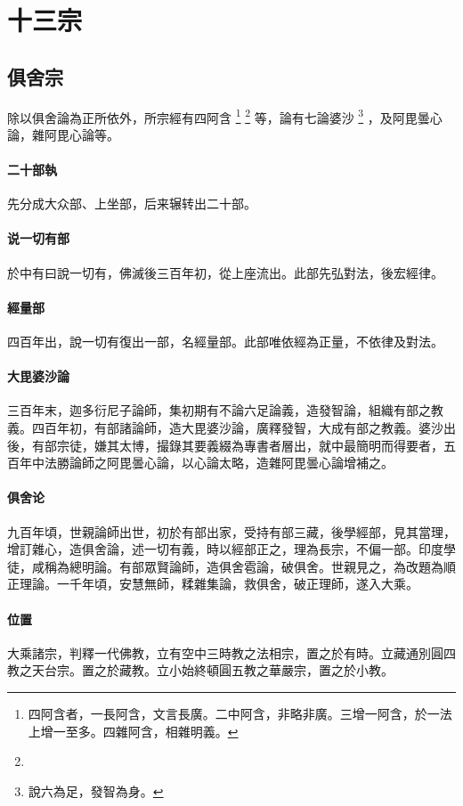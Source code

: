 \section{十三宗}

\subsection{俱舍宗}
除以俱舍論為正所依外，所宗經有四阿含
\footnote{四阿含者，一長阿含，文言長廣。二中阿含，非略非廣。三增一阿含，於一法上增一至多。四雜阿含，相雜明義。}
\footnote{}
等，論有七論婆沙
\footnote{說六為足，發智為身。}
，及阿毘曇心論，雜阿毘心論等。
\paragraph{二十部執}
先分成大众部、上坐部，后来辗转出二十部。
\paragraph{说一切有部}
於中有曰說一切有，佛滅後三百年初，從上座流出。此部先弘對法，後宏經律。
\paragraph{經量部}
四百年出，說一切有復出一部，名經量部。此部唯依經為正量，不依律及對法。
\paragraph{大毘婆沙論}
三百年末，迦多衍尼子論師，集初期有不論六足論義，造發智論，組織有部之教義。四百年初，有部諸論師，造大毘婆沙論，廣釋發智，大成有部之教義。婆沙出後，有部宗徒，嫌其太博，撮錄其要義綴為專書者層出，就中最簡明而得要者，五百年中法勝論師之阿毘曇心論，以心論太略，造雜阿毘曇心論增補之。
\paragraph{俱舍论}
九百年頃，世親論師出世，初於有部出家，受持有部三藏，後學經部，見其當理，增訂雜心，造俱舍論，述一切有義，時以經部正之，理為長宗，不偏一部。印度學徒，咸稱為總明論。有部眾賢論師，造俱舍雹論，破俱舍。世親見之，為改題為順正理論。一千年頃，安慧無師，糅雜集論，救俱舍，破正理師，遂入大乘。
\paragraph{位置}
大乘諸宗，判釋一代佛教，立有空中三時教之法相宗，置之於有時。立藏通別圓四教之天台宗。置之於藏教。立小始終頓圓五教之華嚴宗，置之於小教。

